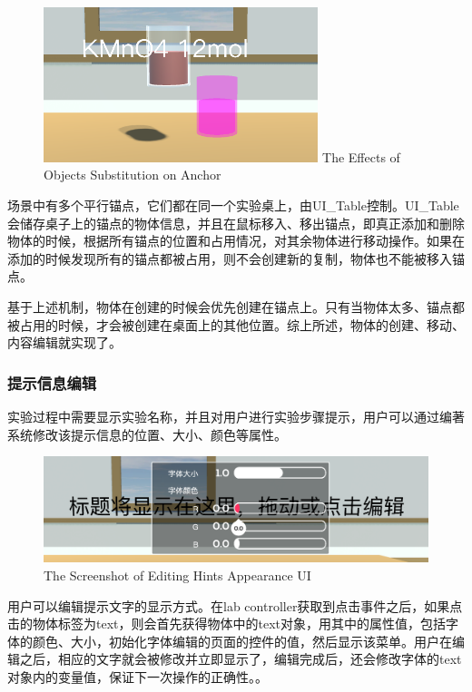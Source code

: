 \begin{figure}[!htp]
  \centering
  \includegraphics[width=8cm]{figure/substi.png}
    {The Effects of Objects Substitution on Anchor}
 \label{fig:substi}
\end{figure}

场景中有多个平行锚点，它们都在同一个实验桌上，由UI\_Table控制。UI\_Table会储存桌子上的锚点的物体信息，并且在鼠标移入、移出锚点，即真正添加和删除物体的时候，根据所有锚点的位置和占用情况，对其余物体进行移动操作。如果在添加的时候发现所有的锚点都被占用，则不会创建新的复制，物体也不能被移入锚点。

基于上述机制，物体在创建的时候会优先创建在锚点上。只有当物体太多、锚点都被占用的时候，才会被创建在桌面上的其他位置。综上所述，物体的创建、移动、内容编辑就实现了。


\subsubsection{提示信息编辑}
实验过程中需要显示实验名称，并且对用户进行实验步骤提示，用户可以通过编著系统修改该提示信息的位置、大小、颜色等属性。

\begin{figure}[!htp]
  \centering
  \includegraphics[width=12cm]{figure/text.png}
    {The Screenshot of Editing Hints Appearance  UI}
 \label{fig:gm}
\end{figure}

用户可以编辑提示文字的显示方式。在lab controller获取到点击事件之后，如果点击的物体标签为text，则会首先获得物体中的text对象，用其中的属性值，包括字体的颜色、大小，初始化字体编辑的页面的控件的值，然后显示该菜单。用户在编辑之后，相应的文字就会被修改并立即显示了，编辑完成后，还会修改字体的text对象内的变量值，保证下一次操作的正确性。。

